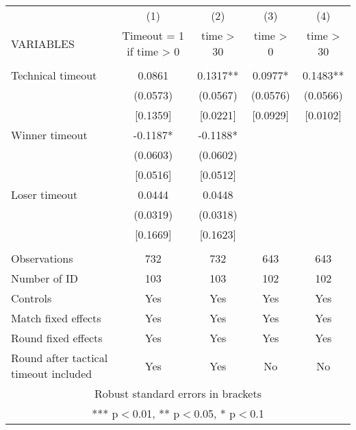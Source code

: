 \documentclass[]{article}
\begin{document}
\begin{tabular}{lcccc} \hline
 & (1) & (2) & (3) & (4) \\
VARIABLES & Timeout = 1 if time > 0 & time > 30 & time > 0 & time > 30 \\ \hline
 &  &  &  &  \\
Technical timeout & 0.0861 & 0.1317** & 0.0977* & 0.1483** \\
 & (0.0573) & (0.0567) & (0.0576) & (0.0566) \\
 & [0.1359] & [0.0221] & [0.0929] & [0.0102] \\
Winner timeout & -0.1187* & -0.1188* &  &  \\
 & (0.0603) & (0.0602) &  &  \\
 & [0.0516] & [0.0512] &  &  \\
Loser timeout & 0.0444 & 0.0448 &  &  \\
 & (0.0319) & (0.0318) &  &  \\
 & [0.1669] & [0.1623] &  &  \\
 &  &  &  &  \\
Observations & 732 & 732 & 643 & 643 \\
Number of ID & 103 & 103 & 102 & 102 \\
Controls & Yes & Yes & Yes & Yes \\
Match fixed effects & Yes & Yes & Yes & Yes \\
Round fixed effects & Yes & Yes & Yes & Yes \\
 Round after tactical timeout included & Yes & Yes & No & No \\ \hline
\multicolumn{5}{c}{ Robust standard errors in brackets} \\
\multicolumn{5}{c}{ *** p$<$0.01, ** p$<$0.05, * p$<$0.1} \\
\end{tabular}
\end{document}
